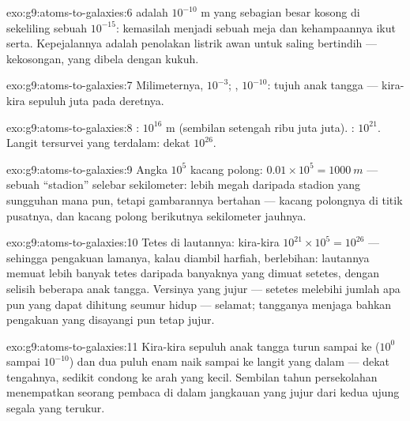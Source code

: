 \begin{solution}{exo:g9:atoms-to-galaxies:6}
 adalah $10^{-10}$ \unit{m} yang sebagian besar kosong di
sekeliling sebuah  $10^{-15}$: kemasilah  menjadi sebuah
meja dan kehampaannya ikut serta. Kepejalannya adalah penolakan
listrik awan  untuk saling bertindih --- kekosongan, yang
dibela dengan kukuh.
\end{solution}

\begin{solution}{exo:g9:atoms-to-galaxies:7}
Milimeternya, $10^{-3}$; , $10^{-10}$: tujuh anak tangga ---
kira-kira sepuluh juta  pada deretnya.
\end{solution}

\begin{solution}{exo:g9:atoms-to-galaxies:8}
: $10^{16}$ \unit{m} (sembilan setengah ribu juta juta).
: $10^{21}$. Langit tersurvei yang terdalam: dekat
$10^{26}$.
\end{solution}

\begin{solution}{exo:g9:atoms-to-galaxies:9}
Angka $10^{5}$ kacang polong: $0.01 \times 10^{5} = \qty{1000}{m}$ ---
sebuah ``stadion'' selebar sekilometer: lebih megah daripada stadion
yang sungguhan mana pun, tetapi gambarannya bertahan --- kacang
polongnya di titik pusatnya, dan kacang polong berikutnya sekilometer
jauhnya.
\end{solution}

\begin{solution}{exo:g9:atoms-to-galaxies:10}
Tetes di lautannya: kira-kira $10^{21} \times 10^{5} = 10^{26}$ ---
sehingga pengakuan lamanya, kalau diambil harfiah, berlebihan:
lautannya memuat lebih banyak tetes daripada banyaknya  yang
dimuat setetes, dengan selisih beberapa anak tangga. Versinya yang
jujur ---  setetes melebihi jumlah apa pun yang dapat dihitung
seumur hidup --- selamat; tangganya menjaga bahkan pengakuan yang
disayangi pun tetap jujur.
\end{solution}

\begin{solution}{exo:g9:atoms-to-galaxies:11}
Kira-kira sepuluh anak tangga turun sampai ke  ($10^{0}$ sampai
$10^{-10}$) dan dua puluh enam naik sampai ke langit yang dalam ---
dekat tengahnya, sedikit condong ke arah yang kecil. Sembilan tahun
persekolahan menempatkan seorang pembaca di dalam jangkauan yang jujur
dari kedua ujung segala yang terukur.
\end{solution}

